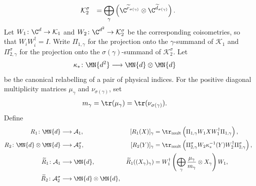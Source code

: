\begin{definition}
\begin{align}
         &
        \mathcal K_2^\sigma
         & =\bigoplus_\gamma
        \left(\C^{\widetilde r_{\sigma(\gamma)}}
        \otimes\C^{\widetilde d_{\sigma(\gamma)}}\right).
        \notag
    \end{align}
    Let $W_1\colon\C^d\to\mathcal K_1$ and
    $W_2\colon\C^{d^2}\to\mathcal K_2^\sigma$ be the corresponding
    coisometries, so that $W_i W_i^\dagger=I$.  Write $\Pi_{1,\gamma}$ for
    the projection onto the $\gamma$-summand of $\mathcal K_1$ and
    $\Pi_{2,\gamma}^\sigma$ for the projection onto the
    $\sigma(\gamma)$-summand of $\mathcal K_2^\sigma$.  Let
    \begin{align}
        \kappa_\ast\colon\MN{d^2}
         & \longrightarrow \MN{d}\otimes\MN{d}
        \notag
    \end{align}
    be the canonical relabelling of a pair of physical indices.  For the
    positive diagonal multiplicity matrices $\mu_\gamma$ and
    $\nu_{\sigma(\gamma)}$, set
    \begin{align}
        m_\gamma
         & =\tr(\mu_\gamma)
        =\tr(\nu_{\sigma(\gamma)}).
        \label{eq:mpdo_bnt_ambient_sector_trace_weights}
    \end{align}
    Define
    \begin{align}
        R_1\colon\MN{d}                  & \longrightarrow\mathcal A_1,
                                         &
        [R_1(X)]_\gamma
                                         & =\tr_{\mathrm{mult}}
        \left(\Pi_{1,\gamma}W_1XW_1^\dagger\Pi_{1,\gamma}\right),
        \label{eq:mpdo_bnt_ambient_sector_R1}
        \\
        R_2\colon\MN{d}\otimes\MN{d}     & \longrightarrow\mathcal A_2^\sigma,
                                         &
        [R_2(Y)]_\gamma
                                         & =\tr_{\mathrm{mult}}
        \left(\Pi_{2,\gamma}^\sigma W_2\kappa_\ast^{-1}(Y)W_2^\dagger
        \Pi_{2,\gamma}^\sigma\right),
        \label{eq:mpdo_bnt_ambient_sector_R2}
        \\
        \widetilde R_1\colon\mathcal A_1 & \longrightarrow\MN{d},
                                         &
        \widetilde R_1((X_\gamma)_\gamma)
                                         & =W_1^\dagger
        \left(\bigoplus_\gamma
        \frac{\mu_\gamma}{m_\gamma}\otimes X_\gamma\right)W_1,
        \label{eq:mpdo_bnt_ambient_sector_R1_tilde}
        \\
        \widetilde R_2\colon\mathcal A_2^\sigma
                                         & \longrightarrow\MN{d}\otimes\MN{d},

\end{align}
\end{definition}
